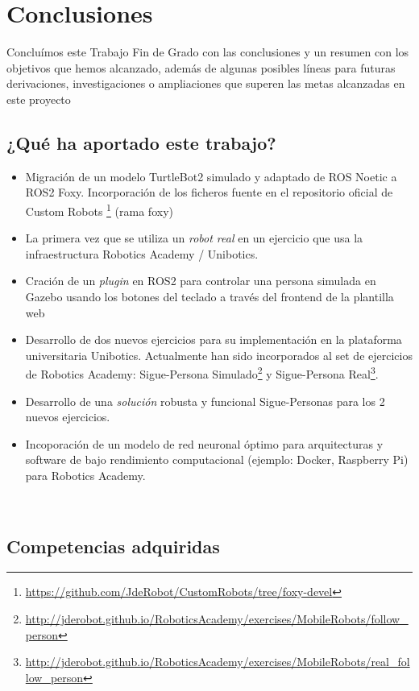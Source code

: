 \chapter{Conclusiones}
\label{cap:Conclusiones}

Concluímos este Trabajo Fin de Grado con las conclusiones y un resumen con los objetivos que hemos alcanzado, además de algunas posibles líneas para futuras derivaciones, investigaciones o ampliaciones que superen las metas alcanzadas en este proyecto

\section{¿Qué ha aportado este trabajo?}
\label{sec:aportaciones}

\begin{itemize}
	\item Migración de un modelo TurtleBot2 simulado y adaptado de ROS Noetic a ROS2 Foxy. Incorporación de los ficheros fuente en el repositorio oficial de Custom Robots \footnote{\url{https://github.com/JdeRobot/CustomRobots/tree/foxy-devel}} (rama foxy)
	\item La primera vez que se utiliza un \textit{robot real} en un ejercicio que usa la infraestructura Robotics Academy / Unibotics.
	\item Cración de un \textit{plugin} en ROS2 para controlar una persona simulada en Gazebo usando los botones del teclado a través del frontend de la plantilla web
	\item Desarrollo de dos nuevos ejercicios para su implementación en la plataforma universitaria Unibotics. Actualmente han sido incorporados al set de ejercicios de Robotics Academy: Sigue-Persona Simulado\footnote{\url{http://jderobot.github.io/RoboticsAcademy/exercises/MobileRobots/follow_person}} y Sigue-Persona Real\footnote{\url{http://jderobot.github.io/RoboticsAcademy/exercises/MobileRobots/real_follow_person}}.
	\item Desarrollo de una \textit{solución} robusta y funcional Sigue-Personas para los 2 nuevos ejercicios.
	\item Incoporación de un modelo de red neuronal óptimo para arquitecturas y software de bajo rendimiento computacional (ejemplo: Docker, Raspberry Pi) para Robotics Academy.
\end{itemize}\

\section{Competencias adquiridas}
\label{sec:competencias}

